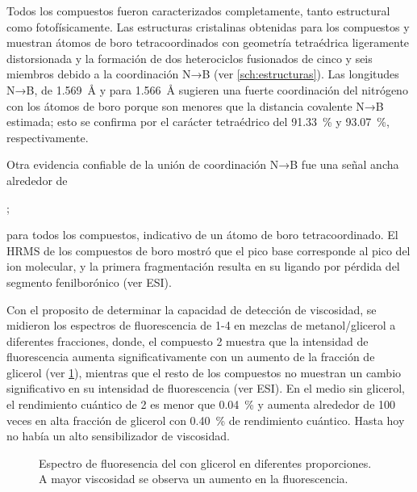\documentclass[spanish,mexico]{scrartcl}
\begin{document}
Todos los compuestos fueron caracterizados completamente, tanto estructural como fotofísicamente. Las estructuras cristalinas obtenidas para los compuestos  y  muestran átomos de boro tetracoordinados con geometría tetraédrica ligeramente distorsionada y la formación de dos heterociclos fusionados de cinco y seis miembros debido a la coordinación N→B (ver \cref{sch:estructuras}). Las longitudes N→B,  de \qty{1.569}{\angstrom} y para  \qty{1.566}{\angstrom} sugieren una fuerte coordinación del nitrógeno con los átomos de boro porque son menores que la distancia covalente N→B estimada; esto se confirma por el carácter tetraédrico del \qty{91.33}{\percent} y \qty{93.07}{\percent}, respectivamente.

Otra evidencia confiable de la unión de coordinación N→B fue una señal ancha alrededor de \begin{experimental}  ; \end{experimental} para todos los compuestos, indicativo de un átomo de boro tetracoordinado. El HRMS de los compuestos de boro mostró que el pico base corresponde al pico del ion molecular, y la primera fragmentación resulta en su ligando por pérdida del segmento fenilborónico (ver ESI). 


Con el proposito de determinar la capacidad de detección de viscosidad, se midieron los espectros de fluorescencia de 1-4 en mezclas de metanol/glicerol a diferentes fracciones, donde, el compuesto 2 muestra que la intensidad de fluorescencia aumenta significativamente con un aumento de la fracción de glicerol (ver \cref{fig:fluorescencia-glicerol}), mientras que el resto de los compuestos no muestran un cambio significativo en su intensidad de fluorescencia (ver ESI). En el medio sin glicerol, el rendimiento cuántico de 2 es menor que \qty{0.04}{\percent} y aumenta alrededor de 100 veces en alta fracción de glicerol con \qty{0.40}{\percent} de rendimiento cuántico. Hasta hoy no había un alto sensibilizador de viscosidad.

\begin{figure}
    \centering
    \label{fig:fluorescencia-glicerol}
    \caption{Espectro de fluoresencia del  con glicerol en diferentes proporciones. A mayor viscosidad se observa un aumento en la fluorescencia.}
\end{figure}
\end{document}
